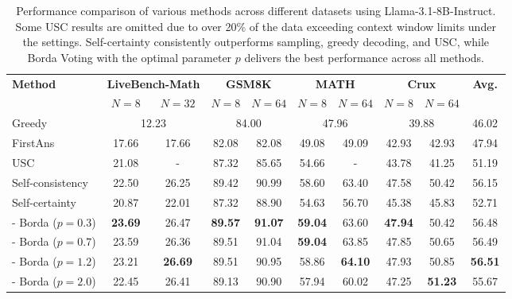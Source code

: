 \begin{table*}[ht]
    \centering
    \caption{Performance comparison of various methods across different datasets using Llama-3.1-8B-Instruct. Some USC results are omitted due to over 20\% of the data exceeding context window limits under the settings. Self-certainty consistently outperforms sampling, greedy decoding, and USC, while Borda Voting with the optimal parameter \(p\) delivers the best performance across all methods.
    }
    \vspace{0.5em}
    \label{tab:results}
    \footnotesize
    \begin{tabular}{lcc  cc  cc  cc c}
        \toprule
        \multirow{2}{*}{\textbf{Method}}  & \multicolumn{2}{c}{\textbf{LiveBench-Math}} & \multicolumn{2}{c}{\textbf{GSM8K}} & \multicolumn{2}{c}{\textbf{MATH}} & \multicolumn{2}{c}{\textbf{Crux}} & \multirow{2}{*}{\textbf{Avg.}}\\ 
       & $N=8$ & $N=32$ & $N=8$ & $N=64$ & $N=8$ & $N=64$ & $N=8$ & $N=64$ & \\
        \midrule
        Greedy            & \multicolumn{2}{c}{12.23} & \multicolumn{2}{c}{84.00} & \multicolumn{2}{c}{47.96} & \multicolumn{2}{c}{39.88} & 46.02\\
        FirstAns          & 17.66 & 17.66 & 82.08 & 82.08 & 49.08 & 49.09 & 42.93 & 42.93 & 47.94 \\
        \midrule
        USC                  & 21.08 &  -    & 87.32 & 85.65 & 54.66 & - &  43.78 & 41.25 & 51.19\\
        Self-consistency     & 22.50 & 26.25 & 89.42 & 90.99 & 58.60 & 63.40 & 47.58 & 50.42 & 56.15 \\
        \midrule            
        Self-certainty       & 20.87 & 22.01 & 87.32 & 88.90 & 54.63 & 56.70 & 45.38 & 45.83 & 52.71 \\
        - Borda ($p=0.3$)    & \textbf{23.69} & 26.47 & \textbf{89.57} & \textbf{91.07} & \textbf{59.04} & 63.60 & \textbf{47.94} & 50.42 & 56.48\\
        - Borda ($p=0.7$)    & 23.59 & 26.36 & 89.51 & 91.04 & \textbf{59.04} & 63.85 & 47.85 & 50.65 & 56.49\\
        - Borda ($p=1.2$)    & 23.21 & \textbf{26.69} & 89.51 & 90.95 & 58.86 & \textbf{64.10} & 47.93 & 50.85 & \textbf{56.51}\\
        - Borda ($p=2.0$)      & 22.45 & 26.41 & 89.13 & 90.90 & 57.94 & 60.02 & 47.25 & \textbf{51.23} & 55.67 \\ 
        \bottomrule
    \end{tabular}
\end{table*}


